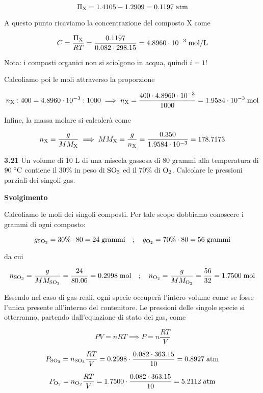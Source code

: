 $$\Pi_{\rm X}=1.4105 - 1.2909 = 0.1197 \; \rm atm$$

A questo punto ricaviamo la concentrazione del composto X come

$$C=\frac{\Pi_{\rm X}}{RT}=\frac{0.1197}{0.082 \cdot 298.15}
=4.8960 \cdot 10^{-3} \; \rm mol/L$$

Nota: i composti organici non si sciolgono in acqua, quindi $i=1$!

Calcoliamo poi le moli attraverso la proporzione

$$n_{\rm X}:400=4.8960 \cdot 10^{-3}:1000
\implies
n_{\rm X}=\frac{400 \cdot 4.8960 \cdot 10^{-3}}{1000}
=1.9584 \cdot 10^{-3} \; \rm mol$$

Infine, la massa molare si calcolerà come

$$n_{\rm X}=\frac{g}{MM_{\rm X}}
\implies
MM_{\rm X}=\frac{g}{n_{\rm X}}=\frac{0.350}{1.9584 \cdot 10^{-3}}=178.7173$$

\vspace{0.2cm}\textbf{3.21} Un volume di 10 L di una miscela gassosa di 80 grammi alla temperatura di $90 \; ^{\circ} \rm C$ contiene il 30\% in peso di $\rm SO_3$ ed il 70\% di $\rm O_2$. Calcolare le pressioni parziali dei singoli gas.

\vspace{0.2cm}\large\textbf{Svolgimento}\normalsize

\vspace{0.2cm}Calcoliamo le moli dei singoli composti. Per tale scopo dobbiamo conoscere i grammi di ogni composto:

$$g_{\rm SO_3}=30\% \cdot 80=24 \; \text{grammi}
\quad;\quad
g_{\rm O_2}=70\% \cdot 80=56 \; \text{grammi}$$

da cui

\vspace{-0.2cm}$$n_{\rm SO_3}=\frac{g}{MM_{\rm SO_3}}=\frac{24}{80.06}=0.2998 \; \text{mol}
\quad;\quad
n_{\rm O_2}=\frac{g}{MM_{\rm O_2}}=\frac{56}{32}=1.7500 \; \text{mol}$$

Essendo nel caso di gas reali, ogni specie occuperà l'intero volume come se fosse l'unica presente all'interno del contenitore. Le pressioni delle singole specie si otterranno, partendo dall'equazione di stato dei gas, come

$$PV=nRT \implies
P=n\frac{RT}{V}$$

$$P_{\rm SO_3}=n_{\rm SO_3} \displaystyle \frac{RT}{V}
=0.2998 \cdot \frac{0.082 \cdot 363.15}{10}
=0.8927 \; \rm atm$$

$$P_{\rm O_2}=n_{\rm O_2} \displaystyle \frac{RT}{V}
=1.7500 \cdot \frac{0.082 \cdot 363.15}{10}
=5.2112 \; \rm atm$$

